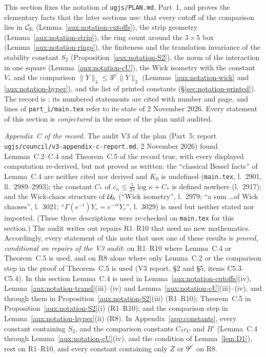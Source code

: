
This section fixes the notation of \texttt{ugjs/PLAN.md}, Part~1, and proves the elementary
facts that the later sections use: that every cutoff of the comparison lies in $\mathcal{C}_{\mathrm E}$
(Lemma~\ref{aux:notation-cutoffs}), the strip geometry (Lemma~\ref{aux:notation-strip}), the
ring count around the $3\times5$ box (Lemma~\ref{aux:notation-rings}), the finiteness and the
translation invariance of the stability constant $S_2$
(Proposition~\ref{aux:notation-S2}), the norm of the interaction in one square
(Lemma~\ref{aux:notation-cU}), the Wick isometry with the constant $V_*$ and the comparison
$\|Y\|_4\le3^{p'}\|Y\|_2$ (Lemmas~\ref{aux:notation-wick} and \ref{aux:notation-hyper}), and
the list of printed constants (\S\ref{sec:notation-printed}).  The record is \cite{R}; its
numbered statements are cited with number and page, and lines of
\texttt{part\_i/main.tex} refer to its state of 2 November 2026.  Every statement of this
section is \emph{conjectured} in the sense of the plan until audited.

{\sloppy\emph{Appendix~C of the record.}  The audit V3 of the plan (Part~5; report
\texttt{ugjs/council/}\allowbreak\texttt{v3-appendix-c-report.md}, 2 November 2026) found Lemmas~C.2--C.4 and
Theorem~C.5 of the record true, with every displayed computation re-derived, but not proved as
written: the ``classical Bessel facts'' of Lemma~C.4 are neither cited nor derived and $K_0$ is
undefined (\texttt{main.tex}, l.~2901, ll.~2989--2993); the constant $C_*$ of
$c_\kappa\le\frac1{2\pi}\log\kappa+C_*$ is defined nowhere (l.~2917); and the Wick-chaos
structure of $\mathcal U_h$ (``Wick isometry'', l.~2979; ``a sum \dots of Wick chaoses'', l.~3021;
``$\Gamma(e^{-t})Y_r=e^{-rt}Y_r$'', l.~3029) is used but neither stated nor imported.  (These
three descriptions were re-checked on \texttt{main.tex} for this section.)  The audit writes out
repairs R1--R10 that need no new mathematics.  Accordingly, every statement of this note that
uses one of these results is \emph{proved, conditional on repairs of the V3 audit}: on
R1--R10 where Lemma~C.4 or Theorem~C.5 is used, and on R8 alone where only Lemma~C.2 or the
comparison step in the proof of Theorem~C.5 is used (V3 report, \S2 and \S5, items
C5.3--C5.4).  In this section Lemma~C.4 is used in Lemma~\ref{aux:notation-cutoffs}(iv),
Lemma~\ref{aux:notation-transl}(iii)--(iv) and Lemma~\ref{aux:notation-cU}(iii)--(iv), and through
them in Proposition~\ref{aux:notation-S2}(iii) (R1--R10); Theorem~C.5 in
Proposition~\ref{aux:notation-S2}(i) (R1--R10); and the comparison step in
Lemma~\ref{aux:notation-hyper}(ii) (R8).  In Appendix~\ref{app:constants}, every constant
containing $S_2$, and the comparison constants $C_7c_U$ and $B'$ (Lemma~C.4 through
Lemma~\ref{aux:notation-cU}(iv), and the condition of Lemma~\ref{lem:D1}), rest on R1--R10, and
every constant containing only $Z$ or $9^{p'}$ on R8.\par}

